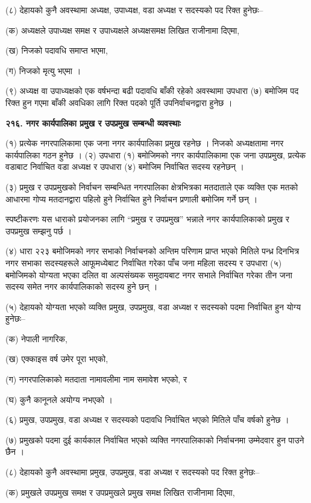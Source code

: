 (८) देहायको कुनै अवस्थामा अध्यक्ष, उपाध्यक्ष, वडा अध्यक्ष र सदस्यको पद रिक्त हुनेछः–

(क) अध्यक्षले उपाध्यक्ष समक्ष र उपाध्यक्षले अध्यक्षसमक्ष लिखित राजीनामा दिएमा,

(ख) निजको पदावधि समाप्त भएमा,

(ग) निजको मृत्यु भएमा ।

(९) अध्यक्ष वा उपाध्यक्षको एक वर्षभन्दा बढी पदावधि बाँकी रहेको अवस्थामा उपधारा (७) बमोजिम पद रिक्त हुन गएमा बाँकी अवधिका लागि रिक्त पदको पूर्ति उपनिर्वाचनद्वारा हुनेछ ।

\textbf{२१६. नगर कार्यपालिका प्रमुख र उपप्रमुख सम्बन्धी व्यवस्थाः}

(१) प्रत्येक नगरपालिकामा एक जना नगर कार्यपालिका प्रमुख रहनेछ । निजको अध्यक्षतामा नगर कार्यपालिका गठन हुनेछ ।
(२) उपधारा (१) बमोजिमको नगर कार्यपालिकामा एक जना उपप्रमुख, प्रत्येक वडाबाट निर्वाचित वडा अध्यक्ष र उपधारा (४) बमोजिम निर्वाचित सदस्य रहनेछन् ।

(३) प्रमुख र उपप्रमुखको निर्वाचन सम्बन्धित नगरपालिका क्षेत्रभित्रका मतदाताले एक व्यक्ति एक मतको आधारमा गोप्य मतदानद्वारा पहिलो हुने निर्वाचित हुने निर्वाचन प्रणाली बमोजिम गर्ने छन् ।

स्पष्टीकरणः यस धाराको प्रयोजनका लागि “प्रमुख र उपप्रमुख” भन्नाले नगर कार्यपालिकाको प्रमुख र उपप्रमुख सम्झनु पर्छ ।

(४) धारा २२३ बमोजिमको नगर सभाको निर्वाचनको अन्तिम परिणाम प्राप्त भएको मितिले पन्ध्र दिनभित्र नगर सभाका सदस्यहरूले आफूमध्येबाट निर्वाचित गरेका पाँच जना महिला सदस्य र उपधारा (५) बमोजिमको योग्यता भएका दलित वा अल्पसंख्यक समुदायबाट नगर सभाले निर्वाचित गरेका तीन जना सदस्य समेत नगर कार्यपालिकाको सदस्य हुने छन् ।

(५) देहायको योग्यता भएको व्यक्ति प्रमुख, उपप्रमुख, वडा अध्यक्ष र सदस्यको पदमा निर्वाचित हुन योग्य हुनेछः–

(क) नेपाली नागरिक,

(ख) एक्काइस वर्ष उमेर पूरा भएको,

(ग) नगरपालिकाको मतदाता नामावलीमा नाम समावेश भएको, र

(घ) कुनै कानूनले अयोग्य नभएको ।

(६) प्रमुख, उपप्रमुख, वडा अध्यक्ष र सदस्यको पदावधि निर्वाचित भएको मितिले पाँच वर्षको हुनेछ ।

(७) प्रमुखको पदमा दुई कार्यकाल निर्वाचित भएको व्यक्ति नगरपालिकाको निर्वाचनमा उम्मेदवार हुन पाउने छैन ।

(८) देहायको कुनै अवस्थामा प्रमुख, उपप्रमुख, वडा अध्यक्ष र सदस्यको पद रिक्त हुनेछः–

(क) प्रमुखले उपप्रमुख समक्ष र उपप्रमुखले प्रमुख समक्ष लिखित राजीनामा दिएमा,

